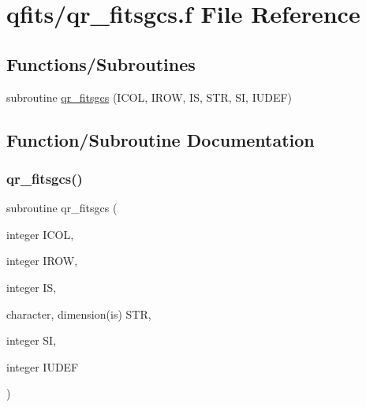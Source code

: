 \hypertarget{qr__fitsgcs_8f}{}\section{qfits/qr\+\_\+fitsgcs.f File Reference}
\label{qr__fitsgcs_8f}
\subsection*{Functions/\+Subroutines}
\begin{DoxyCompactItemize}
\item 
subroutine \hyperlink{qr__fitsgcs_8f_ab371439e9e9fa658d4d9072dcf1ddad9}{qr\+\_\+fitsgcs} (I\+C\+OL, I\+R\+OW, IS, S\+TR, SI, I\+U\+D\+EF)
\end{DoxyCompactItemize}


\subsection{Function/\+Subroutine Documentation}
\mbox{\label{qr__fitsgcs_8f_ab371439e9e9fa658d4d9072dcf1ddad9}} 
\subsubsection{\texorpdfstring{qr\+\_\+fitsgcs()}{qr\_fitsgcs()}}
{\footnotesize\ttfamily subroutine qr\+\_\+fitsgcs (\begin{DoxyParamCaption}\item[{integer}]{I\+C\+OL,  }\item[{integer}]{I\+R\+OW,  }\item[{integer}]{IS,  }\item[{character, dimension(is)}]{S\+TR,  }\item[{integer}]{SI,  }\item[{integer}]{I\+U\+D\+EF }\end{DoxyParamCaption})}

